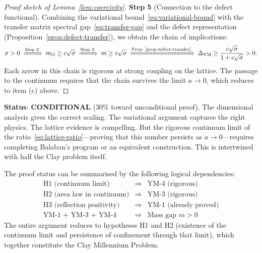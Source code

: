 \documentclass[11pt]{article}
\begin{document}
\begin{proof}[Proof sketch of Lemma~\ref{lem:coercivity}]
\textbf{Step 5} (Connection to the defect functional).  Combining
the variational bound~\eqref{eq:variational-bound} with the transfer
matrix spectral gap~\eqref{eq:transfer-gap} and the defect
representation (Proposition~\ref{prop:defect-transfer}), we obtain the
chain of implications:
\begin{equation}\label{eq:ym4-chain}
  \sigma > 0 \;\xRightarrow{\text{Step 2}}\;
  m_G \geq c\sqrt{\sigma} \;\xRightarrow{\text{Step 3}}\;
  m \geq c\sqrt{\sigma} \;\xRightarrow{\text{Prop.~\ref{prop:defect-transfer}}}\;
  \Delta_{\mathrm{YM}} \geq \frac{c\sqrt{\sigma}}{1 + c\sqrt{\sigma}} > 0.
\end{equation}
Each arrow in this chain is rigorous at strong coupling on the lattice.
The passage to the continuum requires that the chain survives the
limit $a \to 0$, which reduces to item (c) above.
\end{proof}

\textbf{Status}: \textbf{CONDITIONAL} (30\% toward unconditional proof).
The dimensional analysis gives the correct scaling.  The variational
argument captures the right physics.  The lattice evidence is compelling.
But the rigorous continuum limit of the ratio~\eqref{eq:lattice-ratio}---proving
that this number persists as $a \to 0$---requires completing Balaban's
program or an equivalent construction.  This is intertwined with half the
Clay problem itself.

The proof status can be summarised by the following logical dependencies:
\begin{equation}\label{eq:ym4-deps}
\boxed{
\begin{array}{rcl}
  \text{H1 (continuum limit)} &\Longrightarrow& \text{YM-4 (rigorous)} \\
  \text{H2 (area law in continuum)} &\Longrightarrow& \text{YM-3 (rigorous)} \\
  \text{H3 (reflection positivity)} &\Longrightarrow& \text{YM-1 (already proved)} \\
  \text{YM-1 + YM-3 + YM-4} &\Longrightarrow& \text{Mass gap } m > 0
\end{array}
}
\end{equation}
The entire argument reduces to hypotheses H1 and H2 (existence of the
continuum limit and persistence of confinement through that limit),
which together constitute the Clay Millennium Problem.

\end{document}
